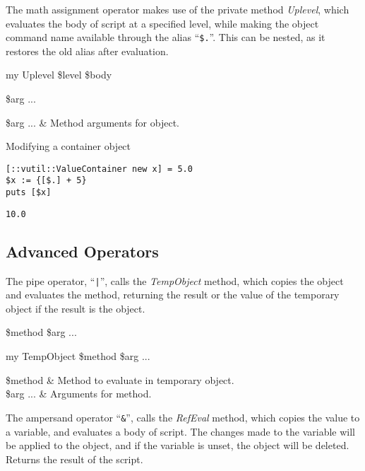 \documentclass{article}
\begin{document}
The math assignment operator makes use of the private method \textit{Uplevel}, which evaluates the body of script at a specified level, while making the object command name available through the alias ``\texttt{\$.}''. This can be nested, as it restores the old alias after evaluation.
\begin{syntax}
my Uplevel \$level \$body
\end{syntax}

\begin{syntax}
 \$arg ...
\end{syntax}
\begin{args}
\$arg ... & Method arguments for object.
\end{args}

\begin{example}{Modifying a container object}
\begin{lstlisting}
[::vutil::ValueContainer new x] = 5.0
$x := {[$.] + 5}
puts [$x]
\end{lstlisting}
\tcblower
\begin{lstlisting}
10.0
\end{lstlisting}
\end{example}

\clearpage
\subsection{Advanced Operators}
The pipe operator, ``\texttt{|}'', calls the \textit{TempObject} method, which copies the object and evaluates the method, returning the result or the value of the temporary object if the result is the object.
\begin{syntax}
 \$method \$arg ... 
\end{syntax}
\begin{syntax}
my TempObject \$method \$arg ...
\end{syntax}

\begin{args}
\$method & Method to evaluate in temporary object. \\
\$arg ... & Arguments for method.
\end{args}

The ampersand operator ``\texttt{\&}'', calls the \textit{RefEval} method, which copies the value to a variable, and evaluates a body of script. 
The changes made to the variable will be applied to the object, and if the variable is unset, the object will be deleted.
Returns the result of the script.
\end{document}
